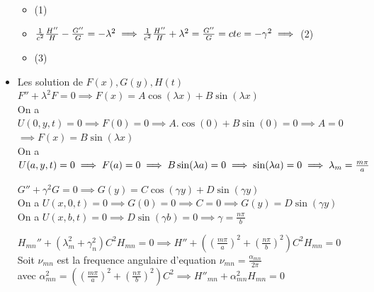 \documentclass[12pt]{book}
\begin{document}
\begin{itemize}
\begin{itemize}
                        \item {}(1)
                        \item $\frac{1}{c^2}\frac{H''}{H}-\frac{G''}{G} = -\lambda^2 \implies \frac{1}{c^2}\frac{H''}{H}+\lambda^2 = \frac{G''}{G}=cte=-\gamma^2 \\
                         \implies$  (2)
                        \item {} (3)
                    \end{itemize}
                \item Les solution de $F(x),G(y),H(t)$\\
                    $F''+\lambda^2F=0 \implies F(x) = A\cos(\lambda x) + B\sin(\lambda x)$ \\
                    On a $U(0,y,t) = 0 \implies F(0)=0 \implies A.\cos(0) + B\sin(0) =0 \implies A =0$ \\
                    $\implies F(x)=B\sin(\lambda x)$\\
                    On a $U(a,y,t) =0 \implies F(a) =0 \implies B\sin(\lambda a) =0 \implies \sin(\lambda a) =0 \\
                    \implies \lambda_m = \frac{m\pi}{a}$ \\
                    \begin{center}
                    \end{center}
                    $G''+\gamma^2G=0 \implies G(y) = C\cos(\gamma y) + D\sin(\gamma y)$ \\
                    On a $U(x,0,t) =0 \implies G(0)=0 \implies C=0 \implies G(y) = D\sin(\gamma y)$ \\
                    On a $U(x,b,t) =0 \implies D\sin(\gamma b) =0 \implies \gamma=\frac{n\pi}{b}$\\
                    \begin{center}
                    \end{center}
                    $H_{mn}''+(\lambda_m^2+\gamma_n^2)C^2H_{mn}=0 \implies H'' +( (\frac{m\pi}{a})^2 + (\frac{n\pi}{b})^2 )C^2H_{mn}=0$ \\
                    Soit $\nu_{mn}$ est la frequence angulaire d'equation   $ \nu_{mn}=\frac{\alpha_{mn}}{2\pi} $ \\
                     avec $ \alpha_{mn}^2 = ( (\frac{m\pi}{a})^2 + (\frac{n\pi}{b})^2 )C^2 \implies H''_{mn} + \alpha^2_{mn}H_{mn}=0$\\

\end{itemize}
\end{document}
